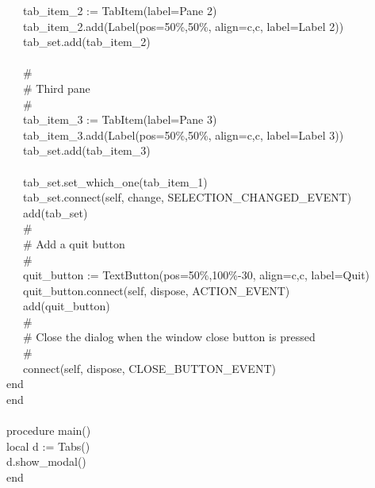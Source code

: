 {\>   \ \ \ tab\_item\_2 := TabItem({\textquotedbl}label=Pane
2{\textquotedbl}) \\
\>   \ \ \ tab\_item\_2.add(Label({\textquotedbl}pos=50\%,50\%{\textquotedbl},
{\textquotedbl}align=c,c{\textquotedbl}, {\textquotedbl}label=Label
2{\textquotedbl})) \\
\>   \ \ \ tab\_set.add(tab\_item\_2) \\
\ \\
\>   \ \ \ \# \\
\>   \ \ \ \# Third pane \\
\>   \ \ \ \# \\
\>   \ \ \ tab\_item\_3 := TabItem({\textquotedbl}label=Pane
3{\textquotedbl}) \\
\>   \ \ \ tab\_item\_3.add(Label({\textquotedbl}pos=50\%,50\%{\textquotedbl},
{\textquotedbl}align=c,c{\textquotedbl}, {\textquotedbl}label=Label
3{\textquotedbl})) \\
\>   \ \ \ tab\_set.add(tab\_item\_3) \\
\ \\
\>   \ \ \ tab\_set.set\_which\_one(tab\_item\_1) \\
\>   \ \ \ tab\_set.connect(self, {\textquotedbl}change{\textquotedbl},
SELECTION\_CHANGED\_EVENT) \\
\>   \ \ \ add(tab\_set) \\
\>   \ \ \ \# \\
\>   \ \ \ \# Add a quit button \\
\>   \ \ \ \# \\
\>   \ \ \ quit\_button :=
TextButton({\textquotedbl}pos=50\%,100\%-30{\textquotedbl},
{\textquotedbl}align=c,c{\textquotedbl},
{\textquotedbl}label=Quit{\textquotedbl}) \\
\>   \ \ \ quit\_button.connect(self,
{\textquotedbl}dispose{\textquotedbl}, ACTION\_EVENT) \\
\>   \ \ \ add(quit\_button) \\
\>   \ \ \ \# \\
\>   \ \ \ \# Close the dialog when the window close button is pressed \\
\>   \ \ \ \# \\
\>   \ \ \ connect(self, {\textquotedbl}dispose{\textquotedbl},
CLOSE\_BUTTON\_EVENT) \\
\>   end \\
end \\
\ \\
procedure main() \\
\>   local d := Tabs() \\
\>   d.show\_modal() \\
end
}


